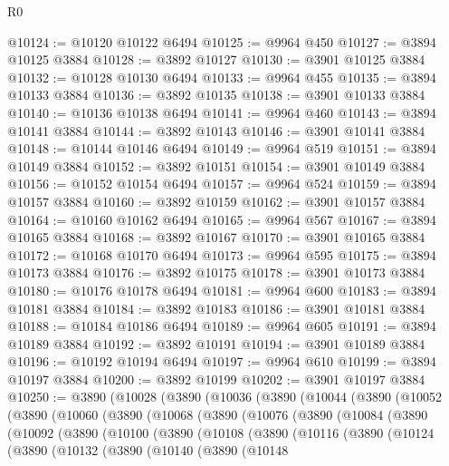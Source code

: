 \begin{lexlean}{R0}
\begin{coremodule}
@10124 := @10120 @10122 @6494
@10125 := @9964 @450
@10127 := @3894 @10125 @3884
@10128 := @3892 @10127
@10130 := @3901 @10125 @3884
@10132 := @10128 @10130 @6494
@10133 := @9964 @455
@10135 := @3894 @10133 @3884
@10136 := @3892 @10135
@10138 := @3901 @10133 @3884
@10140 := @10136 @10138 @6494
@10141 := @9964 @460
@10143 := @3894 @10141 @3884
@10144 := @3892 @10143
@10146 := @3901 @10141 @3884
@10148 := @10144 @10146 @6494
@10149 := @9964 @519
@10151 := @3894 @10149 @3884
@10152 := @3892 @10151
@10154 := @3901 @10149 @3884
@10156 := @10152 @10154 @6494
@10157 := @9964 @524
@10159 := @3894 @10157 @3884
@10160 := @3892 @10159
@10162 := @3901 @10157 @3884
@10164 := @10160 @10162 @6494
@10165 := @9964 @567
@10167 := @3894 @10165 @3884
@10168 := @3892 @10167
@10170 := @3901 @10165 @3884
@10172 := @10168 @10170 @6494
@10173 := @9964 @595
@10175 := @3894 @10173 @3884
@10176 := @3892 @10175
@10178 := @3901 @10173 @3884
@10180 := @10176 @10178 @6494
@10181 := @9964 @600
@10183 := @3894 @10181 @3884
@10184 := @3892 @10183
@10186 := @3901 @10181 @3884
@10188 := @10184 @10186 @6494
@10189 := @9964 @605
@10191 := @3894 @10189 @3884
@10192 := @3892 @10191
@10194 := @3901 @10189 @3884
@10196 := @10192 @10194 @6494
@10197 := @9964 @610
@10199 := @3894 @10197 @3884
@10200 := @3892 @10199
@10202 := @3901 @10197 @3884
@10250 := @3890
    (@10028
      (@3890
        (@10036
          (@3890
            (@10044
              (@3890
                (@10052
                  (@3890
                    (@10060
                      (@3890
                        (@10068
                          (@3890
                            (@10076
                              (@3890
                                (@10084
                                  (@3890
                                    (@10092
                                      (@3890
                                        (@10100
                                          (@3890
                                            (@10108
                                              (@3890
                                                (@10116
                                                  (@3890
                                                    (@10124
                                                      (@3890
                                                        (@10132
                                                          (@3890
                                                            (@10140
                                                              (@3890
                                                                (@10148

\end{coremodule}
\end{lexlean}
